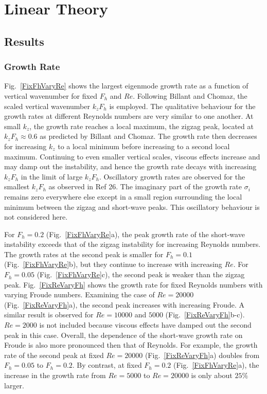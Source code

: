 \chapter{Linear Theory}



\section{Results}

\subsection{Growth Rate}
Fig.~\ref{FixFhVaryRe} shows the largest eigenmode growth rate as a function of vertical wavenumber for fixed $F_{h}$ and $Re$. Following Billant and Chomaz\cite{bc2000c}, the scaled vertical wavenumber $k_{z}F_{h}$ is employed. The qualitative behaviour for the growth rates at different Reynolds numbers are very similar to one another. At small $k_{z}$, the growth rate reaches a local maximum, the zigzag peak, located at $k_{z}F_{h}\approx 0.6$ as predicted by Billant and Chomaz\cite{bc2000c}.  The growth rate then decreases for increasing $k_{z}$ to a local minimum before increasing to a second local maximum. Continuing to even smaller vertical scales, viscous effects increase and may damp out the instability, and hence the growth rate decays with increasing $k_{z}F_{h}$ in the limit of large $k_{z}F_{h}$. Oscillatory growth rates are observed for the smallest $k_{z}F_{h}$ as observed in Ref 26\nocite{bc1999}. The imaginary part of the growth rate $\sigma_{i}$ remains zero everywhere else except in a small region surrounding the local minimum between the zigzag and short-wave peaks. This oscillatory behaviour is not considered here. 

For $F_{h}=0.2$ (Fig.~\ref{FixFhVaryRe}a), the peak growth rate of the short-wave instability exceeds that of the zigzag instability for increasing Reynolds numbers. The growth rates at the second peak is smaller for $F_{h}=0.1$ (Fig.~\ref{FixFhVaryRe}b), but they continue to increase with increasing $Re$. For $F_{h}=0.05$ (Fig.~\ref{FixFhVaryRe}c), the second peak is weaker than the zigzag peak. Fig.~\ref{FixReVaryFh} shows the growth rate for fixed Reynolds numbers with varying Froude numbers. Examining the case of $Re=20000$ (Fig.~\ref{FixReVaryFh}a), the second peak increases with increasing Froude. A similar result is observed for $Re=10000$ and $5000$ (Fig.~\ref{FixReVaryFh}b-c). $Re=2000$ is not included because viscous effects have damped out the second peak in this case. Overall, the dependence of the short-wave growth rate on Froude is also more pronounced then that of Reynolds. For example, the growth rate of the second peak at fixed $Re=20000$ (Fig.~\ref{FixReVaryFh}a) doubles from $F_{h}=0.05$ to $F_{h}=0.2$. By contrast, at fixed $F_{h}=0.2$ (Fig.~\ref{FixFhVaryRe}a), the increase in the growth rate from $Re=5000$ to $Re=20000$ is only about $25\%$ larger. 

